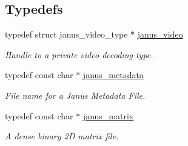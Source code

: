 \subsection*{Typedefs}
\begin{DoxyCompactItemize}
\item 
\hypertarget{group__janus__io_gab8d7aec0b23d9584154fba8594845022}{}typedef struct janus\+\_\+video\+\_\+type $\ast$ \hyperlink{group__janus__io_gab8d7aec0b23d9584154fba8594845022}{janus\+\_\+video}\label{group__janus__io_gab8d7aec0b23d9584154fba8594845022}

\begin{DoxyCompactList}\small\item\em Handle to a private video decoding type. \end{DoxyCompactList}\item 
typedef const char $\ast$ \hyperlink{group__janus__io_gaeddd0e276eebe8616d41808eed8dff16}{janus\+\_\+metadata}
\begin{DoxyCompactList}\small\item\em File name for a Janus Metadata File. \end{DoxyCompactList}\item 
typedef const char $\ast$ \hyperlink{group__janus__io_ga3d3454709ac3ce27a99d42444408f16d}{janus\+\_\+matrix}
\begin{DoxyCompactList}\small\item\em A dense binary 2\+D matrix file. \end{DoxyCompactList}\end{DoxyCompactItemize}
